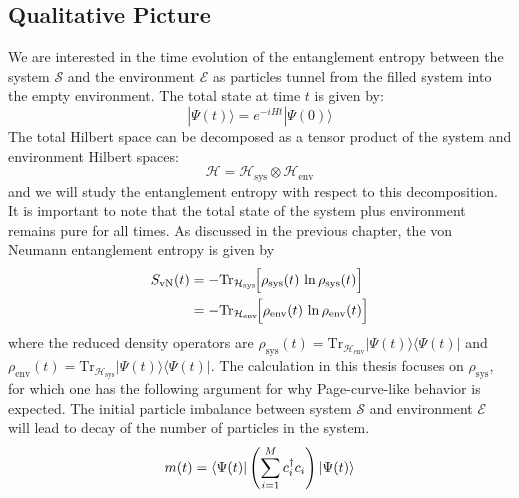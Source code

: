 \documentclass[12pt,oneside,openright]{report}
\theoremstyle{definition}
\theoremstyle{plain}
\theoremstyle{remark}
\newcommand{\beq}{\begin{equation}}
\newcommand{\eeq}{\end{equation}}
\begin{document}
\subsection{Qualitative Picture}
\label{sec:expected_entanglement_dynamics}
We are interested in the time evolution of the entanglement entropy between the system $\mathcal{S}$ and the environment $\mathcal{E}$ as 
particles tunnel from the filled system into the empty environment.
The total state at time $t$ is given by:
\beq
|\Psi(t)\rangle = e^{-iHt}|\Psi(0)\rangle
\eeq
The total Hilbert space can be decomposed as a tensor product of the system and environment Hilbert spaces:
\beq
\mathcal{H} = \mathcal{H}_\mathrm{sys} \otimes \mathcal{H}_\mathrm{env}
\label{eq:hilbert_space_decomposition}
\eeq
and we will study the entanglement entropy with respect to this decomposition. It is important to note that
the total state of the system plus environment remains pure for all times. As discussed in the previous chapter,
the von Neumann entanglement entropy is given by
\begin{equation}{\label{eq:SvN_def}}
\begin{split}
  S_{\mathrm{vN}}(t) & = -\mathrm{Tr}_{\mathcal{H}_{\mathrm{sys}}}\!\Big[\rho_{\mathrm{sys}}(t)\, \ln \rho_{\mathrm{sys}}(t)\Big] \\
                     & = -\mathrm{Tr}_{\mathcal{H}_{\mathrm{env}}}\!\Big[\rho_{\mathrm{env}}(t)\, \ln \rho_{\mathrm{env}}(t)\Big]
\end{split}
\end{equation}
where the reduced density operators are
$\rho_{\mathrm{sys}}(t) = \mathrm{Tr}_{\mathcal{H}_{\mathrm{env}}}|\Psi(t)\rangle\langle\Psi(t)|$ and
$\rho_{\mathrm{env}}(t) = \mathrm{Tr}_{\mathcal{H}_{\mathrm{sys}}}|\Psi(t)\rangle\langle\Psi(t)|$.
The calculation in this thesis focuses on $\rho_{\mathrm{sys}}$, for which one has the following argument
for why Page-curve-like behavior is expected.
The initial particle imbalance between system $\mathcal{S}$ and environment $\mathcal{E}$ will lead to decay of the number of particles in the system.
\begin{equation}
  m(t) = \bra{\Psi(t)}\left(\sum_{i=1}^{M} c_i^\dagger c_i\right) \ket{\Psi(t)}
\end{equation}
\end{document}
